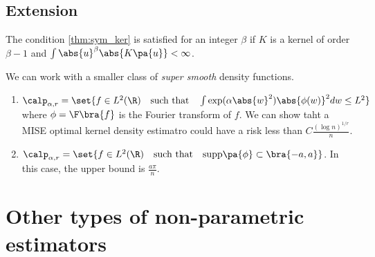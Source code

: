 \subsection{Extension}
\begin{remark}
    The condition \ref{thm:sym_ker} is satisfied for an integer $\beta$ if $K$ is a kernel of order $\beta-1$ and $\int \abs{u}^\beta \abs{K\pa{u}}<\infty$.
\end{remark}
\begin{remark}
    We can work with a smaller class of \textit{super smooth} density functions.
    \begin{enumerate}
        \item $\calp_{\alpha,r}=\set{f\in L^2(\R) \quad \text{such that} \quad \int \exp(\alpha\abs{w}^2)\abs{\phi(w)}^2 dw \le L^2}$ where $\phi=\F\bra{f}$ is the Fourier transform of $f$. We can show taht a MISE optimal kernel density estimatro could have a risk less than $C\frac{(\log n)^{1/r}}{n}$.
        \item $\calp_{\alpha,r}=\set{f\in L^2(\R) \quad \text{such that} \quad \text{supp}\pa{\phi}\subset\bra{-a,a}}$. In this case, the upper bound is $\frac{a\pi}{n}$.
    \end{enumerate}
\end{remark}

\section{Other types of non-parametric estimators}
